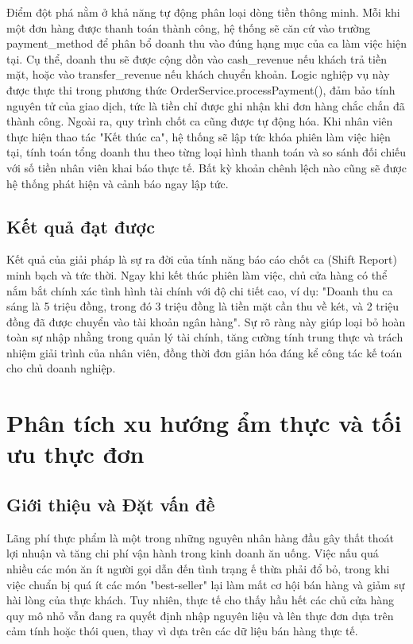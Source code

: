 \documentclass[../20232006p.tex]{subfiles}
\begin{document}
Điểm đột phá nằm ở khả năng tự động phân loại dòng tiền thông minh. Mỗi khi một đơn hàng được thanh toán thành công, hệ thống sẽ căn cứ vào trường payment\_method để phân bổ doanh thu vào đúng hạng mục của ca làm việc hiện tại. Cụ thể, doanh thu sẽ được cộng dồn vào cash\_revenue nếu khách trả tiền mặt, hoặc vào transfer\_revenue nếu khách chuyển khoản. Logic nghiệp vụ này được thực thi trong phương thức OrderService.processPayment(), đảm bảo tính nguyên tử của giao dịch, tức là tiền chỉ được ghi nhận khi đơn hàng chắc chắn đã thành công. Ngoài ra, quy trình chốt ca cũng được tự động hóa. Khi nhân viên thực hiện thao tác "Kết thúc ca", hệ thống sẽ lập tức khóa phiên làm việc hiện tại, tính toán tổng doanh thu theo từng loại hình thanh toán và so sánh đối chiếu với số tiền nhân viên khai báo thực tế. Bất kỳ khoản chênh lệch nào cũng sẽ được hệ thống phát hiện và cảnh báo ngay lập tức.

\subsection{Kết quả đạt được}
Kết quả của giải pháp là sự ra đời của tính năng báo cáo chốt ca (Shift Report) minh bạch và tức thời. Ngay khi kết thúc phiên làm việc, chủ cửa hàng có thể nắm bắt chính xác tình hình tài chính với độ chi tiết cao, ví dụ: "Doanh thu ca sáng là 5 triệu đồng, trong đó 3 triệu đồng là tiền mặt cần thu về két, và 2 triệu đồng đã được chuyển vào tài khoản ngân hàng". Sự rõ ràng này giúp loại bỏ hoàn toàn sự nhập nhằng trong quản lý tài chính, tăng cường tính trung thực và trách nhiệm giải trình của nhân viên, đồng thời đơn giản hóa đáng kể công tác kế toán cho chủ doanh nghiệp.

\section{Phân tích xu hướng ẩm thực và tối ưu thực đơn}

\subsection{Giới thiệu và Đặt vấn đề}
Lãng phí thực phẩm là một trong những nguyên nhân hàng đầu gây thất thoát lợi nhuận và tăng chi phí vận hành trong kinh doanh ăn uống. Việc nấu quá nhiều các món ăn ít người gọi dẫn đến tình trạng ế thừa phải đổ bỏ, trong khi việc chuẩn bị quá ít các món "best-seller" lại làm mất cơ hội bán hàng và giảm sự hài lòng của thực khách. Tuy nhiên, thực tế cho thấy hầu hết các chủ cửa hàng quy mô nhỏ vẫn đang ra quyết định nhập nguyên liệu và lên thực đơn dựa trên cảm tính hoặc thói quen, thay vì dựa trên các dữ liệu bán hàng thực tế.
\end{document}
